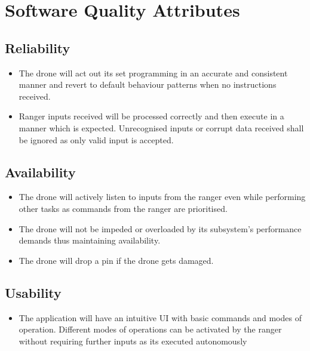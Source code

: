 \section{Software Quality Attributes}
\subsection {Reliability}
\begin{itemize}
	\item The drone will act out its set programming in an accurate and consistent manner and revert to default behaviour patterns when no instructions received.  
	\item Ranger inputs received will be processed correctly and then execute in a manner which is expected. Unrecognised inputs or corrupt data received shall be ignored as only valid input is accepted.
\end{itemize}

\subsection {Availability}
\begin{itemize}
	\item The drone will actively listen to inputs from the ranger even while performing other tasks as commands from the ranger are prioritised. 
	\item The drone will not be impeded or overloaded by its subsystem's performance demands thus maintaining availability. 
	\item The drone will drop a pin if the drone gets damaged. 
\end{itemize}

\subsection {Usability}
\begin{itemize}
	\item The application will have an intuitive UI with basic commands and modes of operation. Different modes of operations can be activated  by the ranger without requiring further inputs as its executed autonomously 
\end{itemize}


